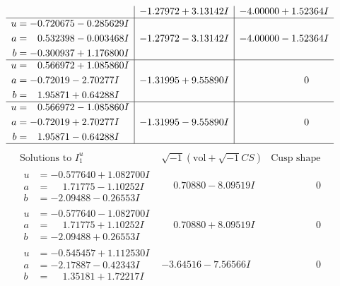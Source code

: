 \documentclass[1p]{elsarticle_modified}
\theoremstyle{definition}
\newcommand{\I}{\sqrt{-1}}
\begin{document}
$$\begin{array}{c|c|c}
 & -1.27972 + 3.13142 I & -4.00000 + 1.52364 I \\ \hline\begin{aligned}
u &= -0.720675 - 0.285629 I \\
a &= \phantom{-}0.532398 - 0.003468 I \\
b &= -0.300937 + 1.176800 I\end{aligned}
 & -1.27972 - 3.13142 I & -4.00000 - 1.52364 I \\ \hline\begin{aligned}
u &= \phantom{-}0.566972 + 1.085860 I \\
a &= -0.72019 - 2.70277 I \\
b &= \phantom{-}1.95871 + 0.64288 I\end{aligned}
 & -1.31995 + 9.55890 I & \phantom{-0.000000 } 0 \\ \hline\begin{aligned}
u &= \phantom{-}0.566972 - 1.085860 I \\
a &= -0.72019 + 2.70277 I \\
b &= \phantom{-}1.95871 - 0.64288 I\end{aligned}
 & -1.31995 - 9.55890 I & \phantom{-0.000000 } 0\\
 \hline 
 \end{array}$$\newpage$$\begin{array}{c|c|c}  
\text{Solutions to }I^u_{1}& \I (\text{vol} + \sqrt{-1}CS) & \text{Cusp shape}\\
 \hline 
\begin{aligned}
u &= -0.577640 + 1.082700 I \\
a &= \phantom{-}1.71775 - 1.10252 I \\
b &= -2.09488 - 0.26553 I\end{aligned}
 & \phantom{-}0.70880 - 8.09519 I & \phantom{-0.000000 } 0 \\ \hline\begin{aligned}
u &= -0.577640 - 1.082700 I \\
a &= \phantom{-}1.71775 + 1.10252 I \\
b &= -2.09488 + 0.26553 I\end{aligned}
 & \phantom{-}0.70880 + 8.09519 I & \phantom{-0.000000 } 0 \\ \hline\begin{aligned}
u &= -0.545457 + 1.112530 I \\
a &= -2.17887 - 0.42343 I \\
b &= \phantom{-}1.35181 + 1.72217 I\end{aligned}
 & -3.64516 - 7.56566 I & \phantom{-0.000000 } 0 \\ \hline\begin{aligned}

\end{aligned}
\end{array}$$
\end{document}
